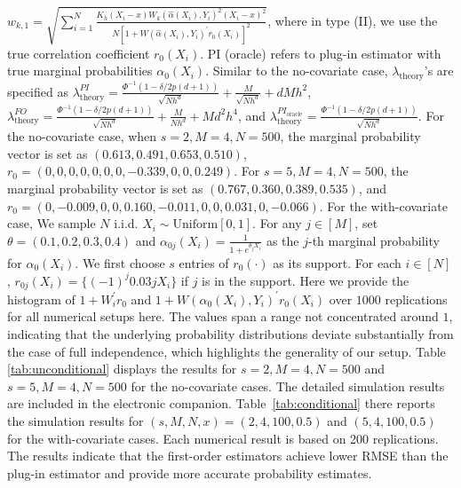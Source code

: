 \documentclass[11pt]{article}
\begin{document}
$w_{k,1}=\sqrt{\sum_{i=1}^N\frac{K_h(X_i-x)W_{k}(\hat{\alpha}(X_i),Y_i)^2(X_{i}-x)^2}{N[1+W(\hat{\alpha}(X_i),Y_i)^\prime r_0(X_i)]^2}}$, where in type (\textrm{II}), we use the true correlation coefficient $r_0(X_i)$.
PI (oracle) refers to plug-in estimator with true marginal probabilities $\alpha_0(X_i)$. Similar to the no-covariate case, $\lambda_{\mathrm{theory}}$'s are specified as
$\lambda_{\mathrm{theory}}^{PI} = \frac{\Phi^{-1}(1 - \delta / 2p(d + 1))}{\sqrt{Nh^d}} + \frac{M}{\sqrt{Nh^d}} + dMh^2$,
$\lambda_{\mathrm{theory}}^{FO} = \frac{\Phi^{-1}(1 - \delta / 2p(d + 1))}{\sqrt{Nh^d}} + \frac{M}{Nh^d} + Md^2h^4$, and
$\lambda_{\mathrm{theory}}^{PI_{\mathrm{oracle}}} = \frac{\Phi^{-1}(1 - \delta / 2p(d + 1))}{\sqrt{Nh^d}}$. For the no-covariate case, when $s=2,M=4,N=500$, the marginal probability vector is set as $(0.613,0.491,0.653,0.510)$, $r_0 = (0,0,0,0,0, 0,0,-0.339,0,0,0.249)$. For $s=5, M=4, N=500$, the marginal probability vector is set as $(0.767,0.360,0.389,0.535)$, and $r_0=(0,-0.009,0,0,0.160,-0.011,0,0,0.031,0,-0.066)$. For the with-covariate case, We sample $N$ i.i.d. $X_i\sim\mathrm{Uniform}[0,1]$. For any $j\in[M]$, set $\theta=(0.1,0.2,0.3,0.4)$ and $\alpha_{0j}(X_i) = \frac{1}{1+e^{\theta_jX_i}}$ as the $j$-th marginal probability for $\alpha_0(X_i)$. We first choose $s$ entries of $r_0(\cdot)$ as its support. 
For each $i\in[N]$, $r_{0j}(X_i)=\{(-1)^j0.03jX_i\}$ if $j$ is in the support. 
Here we provide the histogram of $1+W_i^\prime r_0$ and $1+W(\alpha_0(X_i),Y_i)^\prime r_0(X_i)$ over $1000$ replications for all numerical setups here. The values span a range not concentrated around $1$, indicating that the underlying probability distributions deviate substantially from the case of full independence, which highlights the generality of our setup. Table \ref{tab:unconditional} displays the results for $s=2,M=4,N=500$ and $s=5,M=4,N=500$ for the no-covariate cases. The detailed simulation results are included in the electronic companion. Table~\ref{tab:conditional} there reports the simulation results for $(s, M, N, x) = (2, 4, 100, 0.5)$ and $(5, 4, 100, 0.5)$ for the with-covariate cases. Each numerical result is based on 200 replications. The results indicate that the first-order estimators achieve lower RMSE than the plug-in estimator and provide more accurate probability estimates.
\end{document}
